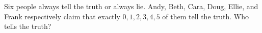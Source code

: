 Six people always tell the truth or always lie. Andy, Beth, Cara, Doug, Ellie, and Frank respectively claim that exactly $0,1,2,3,4,5$ of them tell the truth. Who tells the truth?
